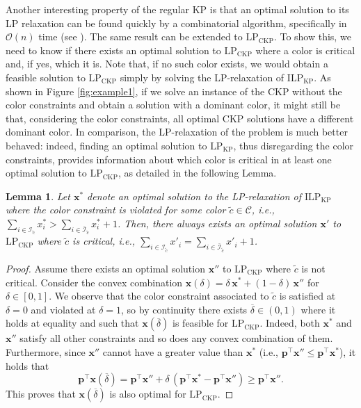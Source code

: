 \documentclass[preprint,11pt]{elsarticle}
\newcommand{\items}{\mathcal{I}}
\newcommand{\colors}{\mathcal{C}}
\newcommand{\profit}{p}
\newcommand{\bx}{\boldsymbol{x}}
\newcommand{\formKP}{\text{ILP}_\text{KP}}
\newcommand{\ckpLP}{\text{LP}_\text{CKP}}
\newcommand{\kpLP}{\text{LP}_\text{KP}}
\newtheorem{lemma}{Lemma}%
\theoremstyle{definition}
\begin{document}
\smallskip

Another interesting property of the regular KP is that an optimal solution to its LP relaxation can be found quickly by a combinatorial algorithm, specifically in $\mathcal{O}(n)$ time (see \cite{KPP04li}).
The same result can be extended to $\ckpLP$.
To show this, we need to know if there exists an optimal solution to $\ckpLP$ where a color is critical and, if yes, which it is.
Note that, if no such color exists, we would obtain a feasible solution to $\ckpLP$ simply by solving the LP-relaxation of $\formKP$.
As shown in Figure \ref{fig:example1}, if we solve an instance of the CKP without the color constraints and obtain a solution with a dominant color, it might still be that, considering the color constraints, all optimal CKP solutions have a different dominant color.
In comparison, the LP-relaxation of the problem is much better behaved: indeed, finding an optimal solution to $\kpLP$, thus disregarding the color constraints, provides information about which color is critical in at least one optimal solution to $\ckpLP$, as detailed in the following Lemma.

\begin{lemma}\label{lemma:lp2ckp}
Let \(\bx^*\) denote an optimal solution to the LP-relaxation of $\formKP$ where the color constraint is violated for some color $\tilde c \in \colors$, i.e., \(\sum_{i \in \items_{\tilde c}}x^*_i > \sum_{i \in \bar{\items}_{\tilde c}}x_i^* + 1\).
Then, there always exists an optimal solution $\bx'$ to $\ckpLP$ where $\tilde c$ is critical, i.e., \(\sum_{i \in \items_{\tilde c}}x'_i = \sum_{i \in \bar{\items}_{\tilde c}}x'_i + 1\).
\end{lemma}
\begin{proof}
    Assume there exists an optimal solution $\bx''$ to $\ckpLP$ where $\tilde c$ is not critical.
    Consider the convex combination $\bx(\delta) =\delta \, \bx^* + (1-\delta) \, \bx''$ for $\delta \in [0,1]$. 
    We observe that the color constraint associated to $\tilde c$ is satisfied at $\delta =0$ and violated at $\delta =1$, so by continuity there exists $\overline \delta\in(0,1)$ where it holds at equality and such that $\bx(\overline \delta)$ is feasible for $\ckpLP$. Indeed, both $\bx^*$ and $\bx''$ satisfy all other constraints and so does any convex combination of them. 
    Furthermore, since $\bx''$ cannot have a greater value than $\bx^*$ (i.e., $\boldsymbol{\profit}^\top \bx'' \leq \boldsymbol{\profit}^\top \bx^*$), it holds that
    \begin{equation*}
       \boldsymbol{\profit}^\top \bx(\overline \delta) = \boldsymbol{\profit}^\top \bx'' + \delta \, (\boldsymbol{\profit}^\top \bx^* - \boldsymbol{\profit}^\top \bx'') \ge \boldsymbol{\profit}^\top \bx''.
    \end{equation*}
    This proves that $\bx(\overline \delta)$ is also optimal for $\ckpLP$.
\end{proof}
\end{document}
